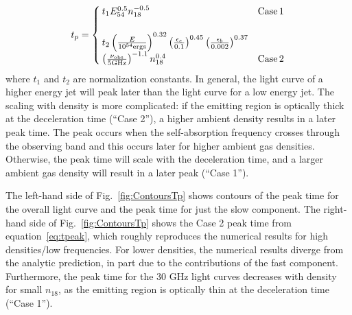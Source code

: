 \documentclass[usenatbib,fleqn]{mnras}
\begin{document}
\begin{align}
t_p=
\begin{cases}
  t_1 E_{54}^{0.5} n_{18}^{-0.5} & {\rm Case \, 1}\\\\
  t_2 \left(\frac{E}{10^{54} {\rm ergs}}\right)^{0.32}
  \left(\frac{\epsilon_e}{0.1}\right)^{0.45}
  \left(\frac{\epsilon_b}{0.002}\right)^{0.37}\\
  \left(\frac{\nu_{\rm obs}}{5 {\rm GHz}}\right)^{-1.1} n_{18}^{0.4} &
  {\rm Case \, 2}
\end{cases}
\label{eq:tpeak}
\end{align}
%
where $t_1$ and $t_2$ are normalization constants. In general, the
light curve of a higher energy jet will peak later than the light
curve for a low energy jet. The scaling with density is more
complicated: if the emitting region is optically thick at the
deceleration time (``Case 2''), a higher ambient density results in a
later peak time. The peak occurs when the self-absorption frequency
crosses through the observing band and this occurs later for higher
ambient gas densities. Otherwise, the peak time will scale with the
deceleration time, and a larger ambient gas density will result in a
later peak (``Case 1'').

The left-hand side of Fig.~\ref{fig:ContoursTp} shows contours of the
peak time for the overall light curve and the peak time for just the
slow component. The right-hand side of Fig.~\ref{fig:ContoursTp} shows
the Case 2 peak time from equation~\eqref{eq:tpeak}, which roughly
reproduces the numerical results for high densities/low
frequencies. For lower densities, the numerical results diverge from
the analytic prediction, in part due to the contributions of the fast
component.  Furthermore, the peak time for the 30 GHz light curves
decreases with density for small $n_{18}$, as the emitting region is
optically thin at the deceleration time (``Case 1'').
\end{document}
